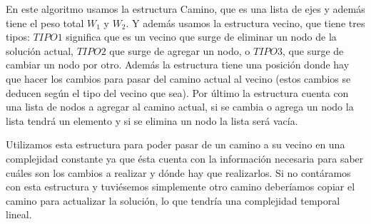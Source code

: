 En este algoritmo usamos la estructura Camino, que es una lista de ejes y además tiene el peso total $W_1$ y $W_2$. Y además usamos la estructura vecino, que tiene tres tipos: $TIPO1$ significa que es un vecino que surge de eliminar un nodo de la solución actual, $TIPO2$ que surge de agregar un nodo, o $TIPO3$, que surge de cambiar un nodo por otro. Además la estructura tiene una posición donde hay que hacer los cambios para pasar del camino actual al vecino (estos cambios se deducen según el tipo del vecino que sea). Por último la estructura cuenta con una lista de nodos a agregar al camino actual, si se cambia o agrega un nodo la lista tendrá un elemento y si se elimina un nodo la lista será vacía.

Utilizamos esta estructura para poder pasar de un camino a su vecino en una complejidad constante ya que ésta cuenta con la información necesaria para saber cuáles son los cambios a realizar y dónde hay que realizarlos. Si no contáramos con esta estructura y tuviésemos simplemente otro camino deberíamos copiar el camino para actualizar la solución, lo que tendría una complejidad temporal lineal.